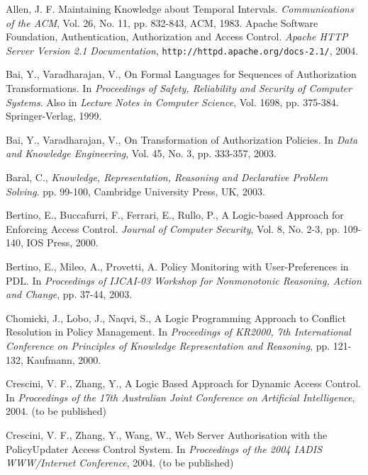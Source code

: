 \documentclass[global,twocolumn,final]{svjour}
\begin{document}
  \begin{thebibliography}{5}
      Allen, J. F.
      Maintaining Knowledge about Temporal Intervals.
      {\em Communications of the ACM},
      Vol. 26, No. 11, pp. 832-843, ACM, 1983.
      Apache Software Foundation,
      Authentication, Authorization and Access Control.
      {\em Apache HTTP Server Version 2.1 Documentation},
      {\tt \scriptsize http://httpd.apache.org/docs-2.1/}, 2004.

      Bai, Y., Varadharajan, V.,
      On Formal Languages for Sequences of Authorization Transformations.
      In {\em Proceedings of Safety, Reliability and Security of Computer
      Systems}. Also in {\em Lecture Notes in Computer Science},
      Vol. 1698, pp. 375-384. Springer-Verlag, 1999.

      Bai, Y., Varadharajan, V.,
      On Transformation of Authorization Policies.
      In {\em Data and Knowledge Engineering},
      Vol. 45, No. 3, pp. 333-357, 2003.

      Baral, C.,
      {\em Knowledge, Representation, Reasoning and Declarative Problem
      Solving}.
      pp. 99-100, Cambridge University Press, UK, 2003.

      Bertino, E., Buccafurri, F., Ferrari, E., Rullo, P.,
      A Logic-based Approach for Enforcing Access Control.
      {\em Journal of Computer Security},
      Vol. 8, No. 2-3, pp. 109-140, IOS Press, 2000.

      Bertino, E., Mileo, A., Provetti, A.
      Policy Monitoring with User-Preferences in PDL.
      In {\em Proceedings of IJCAI-03 Workshop for Nonmonotonic Reasoning,
      Action and Change},
      pp. 37-44, 2003.

      Chomicki, J., Lobo, J., Naqvi, S.,
      A Logic Programming Approach to Conflict Resolution in Policy Management.
      In {\em Proceedings of KR2000, 7th International Conference on Principles
      of Knowledge Representation and Reasoning},
      pp. 121-132, Kaufmann, 2000.

      Crescini, V. F., Zhang, Y.,
      A Logic Based Approach for Dynamic Access Control.
      In {\em Proceedings of the 17th Australian Joint Conference on Artificial
      Intelligence},
      2004. (to be published)

      Crescini, V. F., Zhang, Y., Wang, W.,
      Web Server Authorisation with the PolicyUpdater Access Control System.
      In {\em Proceedings of the 2004 IADIS WWW/Internet Conference},
      2004. (to be published)


\end{thebibliography}
\end{document}
